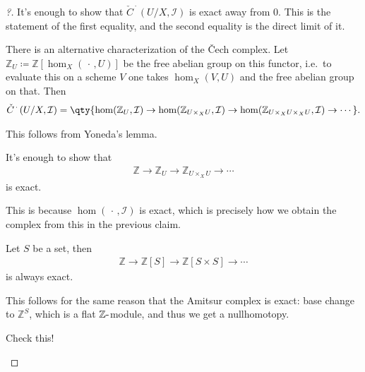 \begin{proof}[?]

It's enough to show that \(\check{C}^{\,\cdot\,}(U/X, \mathcal{I})\) is
exact away from 0. This is the statement of the first equality, and the
second equality is the direct limit of it.

\begin{claim}[1]

There is an alternative characterization of the Čech complex. Let
\({\mathbb{Z}}_U \coloneqq{\mathbb{Z}}[\hom_X({\,\cdot\,}, U)]\) be the
free abelian group on this functor, i.e.~to evaluate this on a scheme
\(V\) one takes \(\hom_X(V, U)\) and the free abelian group on that.
Then
\begin{align*}  
\check{C}^{\,\cdot\,}(U/X, \mathcal{I}) = \qty{ \hom({\mathbb{Z}}_U, \mathcal{I}) \to \hom({\mathbb{Z}}_{U\times_X U}, \mathcal{I}) \to \hom({\mathbb{Z}}_{U\times_X U \times_X U}, \mathcal{I}) \to \cdots}
.\end{align*}

\end{claim}

This follows from Yoneda's lemma.

\begin{claim}[2]

It's enough to show that
\begin{align*}  
{\mathbb{Z}}\to {\mathbb{Z}}_{U} \to {\mathbb{Z}}_{U\times_X U} \to \cdots
\end{align*}
is exact.

\end{claim}

This is because \(\hom({\,\cdot\,}, \mathcal{I})\) is exact, which is
precisely how we obtain the complex from this in the previous claim.

\begin{claim}[3]

Let \(S\) be a set, then
\begin{align*}  
{\mathbb{Z}}\to {\mathbb{Z}}[S] \to {\mathbb{Z}}[S\times S] \to \cdots
\end{align*}
is always exact.

\end{claim}

This follows for the same reason that the Amitsur complex is exact: base
change to \({\mathbb{Z}}^S\), which is a flat
\({\mathbb{Z}}{\hbox{-}}\)module, and thus we get a nullhomotopy.

\begin{exercise}[?]

Check this!

\end{exercise}

\end{proof}

